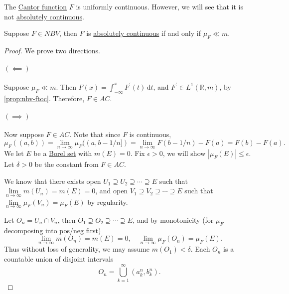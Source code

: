 \begin{eg}
	The \hyperref[sssec:Cantor-Function]{Cantor function} \(F\) is uniformly continuous.
	However, we will see that it is not \hyperref[def:absolutely-continuous-function]{absolutely continuous}.
\end{eg}

\begin{proposition}\label{prop:abs-cts}
	Suppose \(F \in NBV\), then \(F\) is \hyperref[def:absolutely-continuous-function]{absolutely continuous} if and only if \(\mu_F \ll m\).
\end{proposition}
\begin{proof}
	We prove two directions.
	\paragraph{\((\impliedby)\)}
	Suppose \(\mu_F \ll m\). Then \(F(x) = \int_{-\infty}^x F^\prime (t) \,\mathrm{d}t\), and \(F^\prime \in L^1(\mathbb{R},m)\), by \autoref{prop:nbv-ftoc}. Therefore, \(F \in AC\).

	\paragraph{\((\implies)\)}
	Now suppose \(F \in AC\). Note that since \(F\) is continuous,
	\[
		\mu_F((a,b)) = \lim_{n \to \infty} \mu_F((a,b-1/n]) = \lim_{n \to \infty} F(b-1/n) - F(a) = F(b) - F(a).
	\]
	We let \(E\) be a \hyperref[def:Borel-set]{Borel set} with \(m(E) = 0\). Fix \(\epsilon > 0\), we will show \(\left\vert \mu_F(E) \right\vert \leq \epsilon \).
	Let \(\delta > 0\) be the constant from \(F \in AC\).

	We know that there exists open \(U_1 \supseteq U_2 \supseteq \cdots \supseteq E\) such that \(\lim\limits_{n \to \infty} m(U_n) = m(E) = 0\), and open
	\(V_1 \supseteq V_2 \supseteq \cdots \supseteq E\) such that \(\lim\limits_{n \to \infty} \mu_F(V_n) = \mu_F(E)\) by regularity.

	Let \(O_n = U_n \cap V_n\), then \(O_1 \supseteq O_2 \supseteq \cdots \supseteq E\), and by monotonicity (for \(\mu_F\) decomposing into pos/neg first)
	\[
		\lim_{n \to \infty} m(O_n) = m(E) = 0,\quad \lim_{n \to \infty} \mu_F(O_n) = \mu_F(E).
	\]
	Thus without loss of generality, we may assume \(m(O_1) < \delta\). Each \(O_n\) is a countable union of disjoint intervals
	\[
		O_n = \bigcup_{k=1}^\infty \left( a_k^n, b_k^n \right).
	\]


\end{proof}
